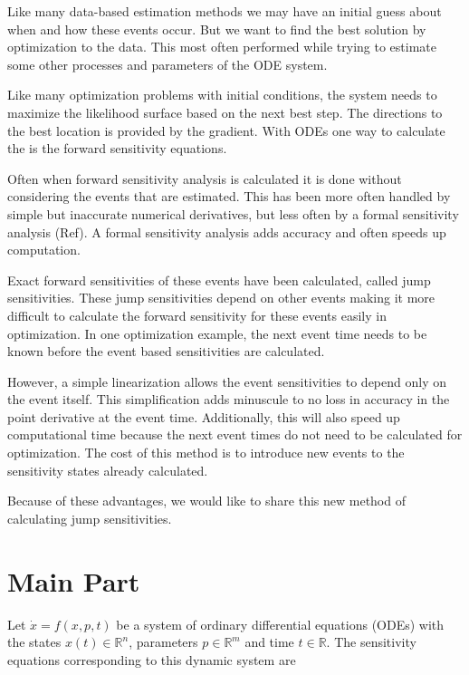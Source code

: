 \documentclass[journal, a4paper]{IEEEtran}
\begin{document}
	Like many data-based estimation methods we may have an initial guess about
	when and how these events occur.  But we want to find the best solution
	by optimization to the data. This most often performed while trying to
	estimate some other processes and parameters of the ODE system.

	Like many optimization problems with initial conditions, the system needs
	to maximize the likelihood surface based on the next best step.
	The directions to the best location is provided by the gradient.
	With ODEs one way to calculate the is the forward sensitivity equations.

	Often when forward sensitivity analysis is calculated it is
        done without considering the events that are estimated.  This
        has been more often handled by simple but inaccurate numerical
        derivatives, but less often by a formal sensitivity analysis
        (Ref).  A formal sensitivity analysis adds accuracy and often
        speeds up computation.

	Exact forward sensitivities of these events have been
        calculated, called jump sensitivities. These jump
        sensitivities depend on other events making it more difficult
        to calculate the forward sensitivity for these events easily
        in optimization.  In one optimization example, the next event
        time needs to be known before the event based sensitivities
        are calculated.

	However, a simple linearization allows the event sensitivities
        to depend only on the event itself.  This simplification adds
        minuscule to no loss in accuracy in the point derivative at
        the event time.  Additionally, this will also speed up
        computational time because the next event times do not need to
        be calculated for optimization.  The cost of this method is to
        introduce new events to the sensitivity states already
        calculated.

	Because of these advantages, we would like to share this new method of calculating jump sensitivities.


\section{Main Part}
\label{sec:main}

Let $\dot x = f(x, p, t)$ be a system of ordinary differential
equations (ODEs) with the states $x(t) \in \mathbb R^n$, parameters $p
\in \mathbb R^m$ and time $t \in \mathbb R$. The sensitivity equations
corresponding to this dynamic system are
\end{document}
